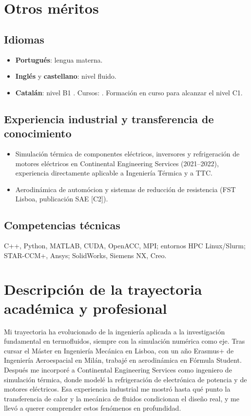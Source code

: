 \documentclass[11pt]{article}
\begin{document}
\section{Otros m\'eritos}
\subsection{Idiomas}
\begin{itemize}
  \item \textbf{Portugu\'es}: lengua materna.
  \item \textbf{Ingl\'es} y \textbf{castellano}: nivel fluido. 
  \item \textbf{Catal\'an}: nivel B1 .
  Cursos: . Formaci\'on en curso para alcanzar el nivel C1.
\end{itemize}
\subsection{Experiencia industrial y transferencia de conocimiento}
\begin{itemize}
  \item Simulaci\'on t\'ermica de componentes el\'ectricos, inversores y refrigeraci\'on de
  motores el\'ectricos en Continental Engineering Services (2021--2022), experiencia
  directamente aplicable a Ingenier\'ia T\'ermica y a TTC.
  \item Aerodin\'amica de autom\'ocion y sistemas de reducci\'on de resistencia (FST Lisboa,
  publicaci\'on SAE [C2]).
\end{itemize}
\subsection{Competencias t\'ecnicas}
C++, Python, MATLAB, CUDA, OpenACC, MPI; entornos HPC Linux/Slurm; STAR-CCM+, Ansys;
SolidWorks, Siemens NX, Creo.

\section{Descripci\'on de la trayectoria acad\'emica y profesional}
Mi trayectoria ha evolucionado de la ingenier\'ia aplicada a la investigaci\'on fundamental
en termofluidos, siempre con la simulaci\'on num\'erica como eje. Tras cursar el M\'aster en
Ingenier\'ia Mec\'anica en Lisboa, con un a\~no Erasmus+ de Ingenier\'ia Aeroespacial en
Mil\'an, trabaj\'e en aerodin\'amica en F\'ormula Student. Despu\'es me incorpor\'e a
Continental Engineering Services como ingeniero de simulaci\'on t\'ermica, donde model\'e la
refrigeraci\'on de electr\'onica de potencia y de motores el\'ectricos. Esa experiencia
industrial me mostr\'o hasta qu\'e punto la transferencia de calor y la mec\'anica de fluidos
condicionan el dise\~no real, y me llev\'o a querer comprender estos fen\'omenos en
profundidad.
\end{document}
